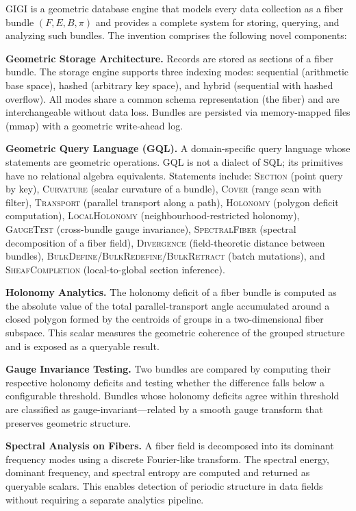 \documentclass[11pt,letterpaper]{article}
\begin{document}
GIGI is a geometric database engine that models every data collection as a fiber bundle $(F, E, B, \pi)$ and provides a complete system for storing, querying, and analyzing such bundles. The invention comprises the following novel components:

\textbf{Geometric Storage Architecture.} Records are stored as sections of a fiber bundle. The storage engine supports three indexing modes: sequential (arithmetic base space), hashed (arbitrary key space), and hybrid (sequential with hashed overflow). All modes share a common schema representation (the fiber) and are interchangeable without data loss. Bundles are persisted via memory-mapped files (mmap) with a geometric write-ahead log.

\textbf{Geometric Query Language (GQL).} A domain-specific query language whose statements are geometric operations. GQL is not a dialect of SQL; its primitives have no relational algebra equivalents. Statements include: \textsc{Section} (point query by key), \textsc{Curvature} (scalar curvature of a bundle), \textsc{Cover} (range scan with filter), \textsc{Transport} (parallel transport along a path), \textsc{Holonomy} (polygon deficit computation), \textsc{LocalHolonomy} (neighbourhood-restricted holonomy), \textsc{GaugeTest} (cross-bundle gauge invariance), \textsc{SpectralFiber} (spectral decomposition of a fiber field), \textsc{Divergence} (field-theoretic distance between bundles), \textsc{BulkDefine}/\textsc{BulkRedefine}/\textsc{BulkRetract} (batch mutations), and \textsc{SheafCompletion} (local-to-global section inference).

\textbf{Holonomy Analytics.} The holonomy deficit of a fiber bundle is computed as the absolute value of the total parallel-transport angle accumulated around a closed polygon formed by the centroids of groups in a two-dimensional fiber subspace. This scalar measures the geometric coherence of the grouped structure and is exposed as a queryable result.

\textbf{Gauge Invariance Testing.} Two bundles are compared by computing their respective holonomy deficits and testing whether the difference falls below a configurable threshold. Bundles whose holonomy deficits agree within threshold are classified as gauge-invariant---related by a smooth gauge transform that preserves geometric structure.

\textbf{Spectral Analysis on Fibers.} A fiber field is decomposed into its dominant frequency modes using a discrete Fourier-like transform. The spectral energy, dominant frequency, and spectral entropy are computed and returned as queryable scalars. This enables detection of periodic structure in data fields without requiring a separate analytics pipeline.
\end{document}

